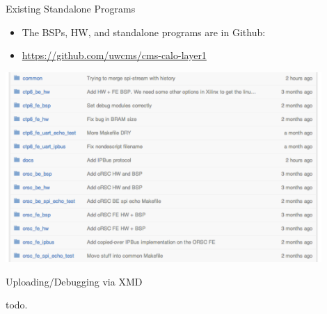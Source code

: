 \documentclass{beamer}
\begin{document}
\begin{frame}{Existing Standalone Programs}
\begin{itemize}
\item The BSPs, HW, and standalone programs are in Github:
\item \url{https://github.com/uwcms/cms-calo-layer1}
\end{itemize}
\begin{center}
\includegraphics[width=0.9\textwidth]{images/standalone_packages.pdf}
\end{center}
\end{frame}

\begin{frame}{Uploading/Debugging via XMD}
\begin{center}
todo.
\end{center}
\end{frame}
\end{document}
